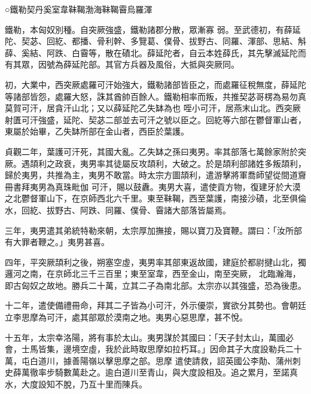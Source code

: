 
\begin{pinyinscope}

 ○鐵勒契丹奚室韋靺鞨渤海靺鞨霫烏羅渾



 鐵勒，本匈奴別種。自突厥強盛，鐵勒諸郡分散，眾漸寡
 弱。至武德初，有薛延陀、契苾、回紇、都播、骨利幹、多覽葛、僕骨、拔野古、同羅、渾部、思結、斛薛、奚結、阿跌、白霫等，散在磧北。薛延陀者，自云本姓薛氏，其先擊滅延陀而有其眾，因號為薛延陀部。其官方兵器及風俗，大抵與突厥同。



 初，大業中，西突厥處羅可汗始強大，鐵勒諸部皆臣之，而處羅征稅無度，薛延陀等諸部皆怨，處羅大怒，誅其酋帥百餘人。鐵勒相率而叛，共推契苾哥楞為易勿真莫賀可汗，居貪汗山北；又以薛延陀乙失缽為也
 咥小可汗，居燕末山北。西突厥射匱可汗強盛，延陀、契苾二部並去可汗之號以臣之。回紇等六部在鬱督軍山者，東屬於始畢，乙失缽所部在金山者，西臣於葉護。



 貞觀二年，葉護可汗死，其國大亂。乙失缽之孫曰夷男。率其部落七萬餘家附於突厥。遇頡利之政衰，夷男率其徒屬反攻頡利，大破之。於是頡利部諸姓多叛頡利，歸於夷男，共推為主，夷男不敢當。時太宗方圖頡利，遣游擊將軍喬師望從間道齎冊書拜夷男為真珠毗伽
 可汗，賜以鼓纛。夷男大喜，遣使貢方物，復建牙於大漠之北鬱督軍山下，在京師西北六千里。東至靺鞨，西至葉護，南接沙磧，北至俱倫水，回紇、拔野古、阿跌、同羅、僕骨、霫諸大部落皆屬焉。



 三年，夷男遣其弟統特勒來朝，太宗厚加撫接，賜以寶刀及寶鞭。謂曰：「汝所部有大罪者鞭之。」夷男甚喜。



 四年，平突厥頡利之後，朔塞空虛，夷男率其部東返故國，建庭於都尉揵山北，獨邏河之南，在京師北三千三百里；東至室韋，西至金山，南至突厥，
 北臨瀚海，即古匈奴之故地。勝兵二十萬，立其二子為南北部。太宗亦以其強盛，恐為後患。



 十二年，遣使備禮冊命，拜其二子皆為小可汗，外示優崇，實欲分其勢也。會朝廷立李思摩為可汗，處其部眾於漠南之地。夷男心惡思摩，甚不悅。



 十五年，太宗幸洛陽，將有事於太山。夷男謀於其國曰：「天子封太山，萬國必會，士馬皆集，邊境空虛，我於此時取思摩如拉朽耳。」因命其子大度設勒兵二十萬，屯白道川，據善陽嶺以擊思摩之部。思摩
 遣使請救，詔英國公李勣、蒲州刺史薛萬徹率步騎數萬赴之。逾白道川至青山，與大度設相及。追之累月，至諾真水，大度設知不脫，乃互十里而陳兵。




\end{pinyinscope}
